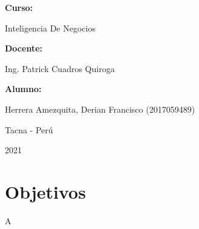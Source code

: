 \documentclass[12pt,letterpaper]{article}
\begin{document}
\begin{titlepage}
\begin{center}
\vspace*{0.3in}
\begin{Large}
\textbf{Curso:} \\
\end{Large}

\vspace*{0.1in}
\begin{large}
    Inteligencia De Negocios\\
\end{large}

\vspace*{0.3in}
\begin{Large}
\textbf{Docente:} \\
\end{Large}

\vspace*{0.1in}
\begin{large}
Ing. Patrick Cuadros Quiroga\\
\end{large}

\vspace*{0.2in}
\vspace*{0.1in}
\begin{large}
\textbf{Alumno:} \\
\begin{flushleft}
 Herrera Amezquita, Derian Francisco		\hfill	(2017059489) \\


\end{flushleft}
\end{large}
\vspace*{0.1in}
\begin{large}
Tacna - Perú\\
\end{large}
\vspace*{0.1in}
\begin{large}
2021\\
\end{large}

\end{center}

\end{titlepage}



\tableofcontents %
\thispagestyle{empty} %
\newpage
\setcounter{page}{1} %


\section{Objetivos}
A
\end{document}

